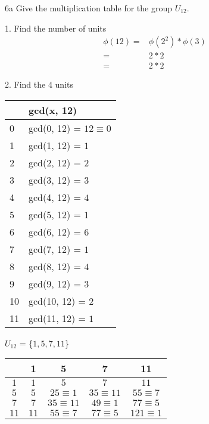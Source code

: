 \begin{question}{6a}
Give the multiplication table for the group $U_{12}$.

1. Find the number of units
\begin{align*}
\phi(12) =& \phi(2^2) * \phi(3)\\
=& 2 * 2\\
=& 2 * 2
\end{align*}

2. Find the 4 units

\centering
\begin{tabular}{l|l}
& gcd(x, 12)\\
\hline
0 & gcd(0, 12) = $12 \equiv 0$\\
1 & gcd(1, 12) = $1$\\
2 & gcd(2, 12) = $2$\\
3 & gcd(3, 12) = $3$\\
4 & gcd(4, 12) = $4$\\
5 & gcd(5, 12) = $1$\\
6 & gcd(6, 12) = $6$\\
7 & gcd(7, 12) = $1$\\
8 & gcd(8, 12) = $4$\\
9 & gcd(9, 12) = $3$\\
10 & gcd(10, 12) = $2$\\
11 & gcd(11, 12) = $1$\\
\end{tabular}

$U_{12}$ = \{$1, 5, 7, 11$\}

\begin{tabular}{c|c|c|c|c}
& 1 & 5 & 7 & 11\\
\hline
$1$ & $1$& $5$& $7$& $11$\\

$5$ & $5$& $25 \equiv 1$& $35 \equiv 11$& $55 \equiv 7$\\

$7$ & $7$& $35 \equiv 11$& $49 \equiv 1$& $77 \equiv 5$\\

$11$ & $11$& $55 \equiv 7$& $77 \equiv 5$& $121 \equiv 1$
\end{tabular}
\end{question}

